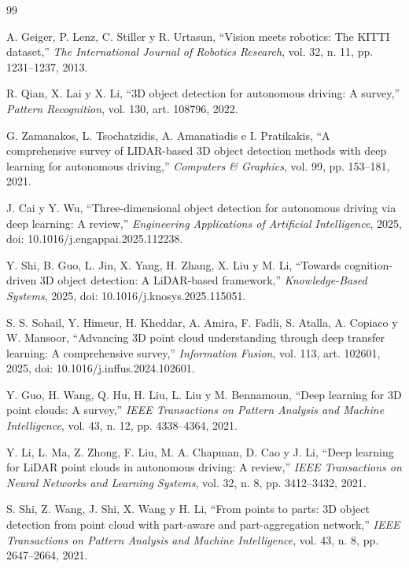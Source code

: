 \documentclass[11pt,letterpaper]{article}
\begin{document}
\begin{thebibliography}{99}
\footnotesize
\setlength{\itemsep}{0pt}

A. Geiger, P. Lenz, C. Stiller y R. Urtasun, ``Vision meets robotics: The KITTI dataset,'' \emph{The International Journal of Robotics Research}, vol. 32, n.\textordmasculine{} 11, pp. 1231--1237, 2013.

R. Qian, X. Lai y X. Li, ``3D object detection for autonomous driving: A survey,'' \emph{Pattern Recognition}, vol. 130, art. 108796, 2022.

G. Zamanakos, L. Tsochatzidis, A. Amanatiadis e I. Pratikakis, ``A comprehensive survey of LIDAR-based 3D object detection methods with deep learning for autonomous driving,'' \emph{Computers \& Graphics}, vol. 99, pp. 153--181, 2021.

J. Cai y Y. Wu, ``Three-dimensional object detection for autonomous driving via deep learning: A review,'' \emph{Engineering Applications of Artificial Intelligence}, 2025, doi: 10.1016/j.engappai.2025.112238.

Y. Shi, B. Guo, L. Jin, X. Yang, H. Zhang, X. Liu y M. Li, ``Towards cognition-driven 3D object detection: A LiDAR-based framework,'' \emph{Knowledge-Based Systems}, 2025, doi: 10.1016/j.knosys.2025.115051.

S. S. Sohail, Y. Himeur, H. Kheddar, A. Amira, F. Fadli, S. Atalla, A. Copiaco y W. Mansoor, ``Advancing 3D point cloud understanding through deep transfer learning: A comprehensive survey,'' \emph{Information Fusion}, vol. 113, art. 102601, 2025, doi: 10.1016/j.inffus.2024.102601.

Y. Guo, H. Wang, Q. Hu, H. Liu, L. Liu y M. Bennamoun, ``Deep learning for 3D point clouds: A survey,'' \emph{IEEE Transactions on Pattern Analysis and Machine Intelligence}, vol. 43, n.\textordmasculine{} 12, pp. 4338--4364, 2021.

Y. Li, L. Ma, Z. Zhong, F. Liu, M. A. Chapman, D. Cao y J. Li, ``Deep learning for LiDAR point clouds in autonomous driving: A review,'' \emph{IEEE Transactions on Neural Networks and Learning Systems}, vol. 32, n.\textordmasculine{} 8, pp. 3412--3432, 2021.

S. Shi, Z. Wang, J. Shi, X. Wang y H. Li, ``From points to parts: 3D object detection from point cloud with part-aware and part-aggregation network,'' \emph{IEEE Transactions on Pattern Analysis and Machine Intelligence}, vol. 43, n.\textordmasculine{} 8, pp. 2647--2664, 2021.


\end{thebibliography}
\end{document}
